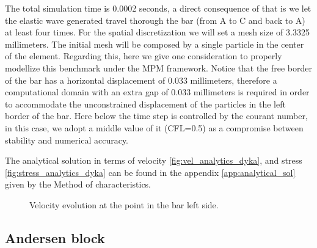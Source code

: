 The total simulation time is 0.0002 seconds, a direct consequence of
that is we let the elastic wave generated travel thorough the bar
(from A to C and back to A) at least four times. For the spatial
discretization we will set a mesh size of 3.3325 millimeters. The
initial mesh will be composed by a single particle in the center of
the element. Regarding this, here we give one consideration to
properly modellize this benchmark under the MPM framework. Notice that
the free border of the bar has a horizontal displacement of 0.033
millimeters, therefore a computational domain with an extra gap of
0.033 millimeters is required in order to accommodate the
unconstrained displacement of the particles in the left border of the
bar. Here below the time step is controlled by the courant number, in
this case, we adopt a middle value of it (CFL=0.5) as a compromise
between stability and numerical accuracy. 

The analytical solution in terms of velocity
\ref{fig:vel_analytics_dyka}, and stress
\ref{fig:stress_analytics_dyka} can be found in the appendix
\ref{app:analytical_sol} given by the Method of characteristics.

\begin{figure}\sidecaption
  \centering
  \caption{Velocity evolution at the point in the bar left side.}
  \label{fig:Dyka-PCE-FE}
\end{figure}

\subsection{Andersen block}
\label{sec:andersen-block}

